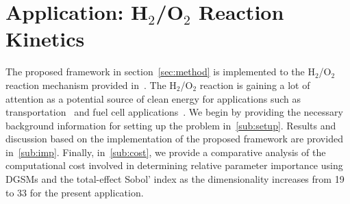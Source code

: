 \section{Application: H$_2$/O$_2$ Reaction Kinetics}
\label{sec:app}

%
%

The proposed framework in section~\ref{sec:method} is implemented to 
the H$_2$/O$_2$ reaction mechanism provided in~\cite{Yetter:1991}.
The H$_2$/O$_2$ reaction is gaining a lot of attention as a potential
source of clean energy for applications such as 
transportation~\cite{Das:1996} and fuel cell 
applications~\cite{Loges:2008,Cosnier:2016}. We begin by providing
the necessary background information for setting up the problem
in~\ref{sub:setup}. Results and discussion based on the implementation
of the proposed framework are provided in~\ref{sub:imp}. Finally, 
in~\ref{sub:cost}, we
provide a comparative analysis of the computational cost involved
in determining relative parameter importance using DGSMs and the
total-effect Sobol' index as the dimensionality increases from 19 to 33
for the present application.

